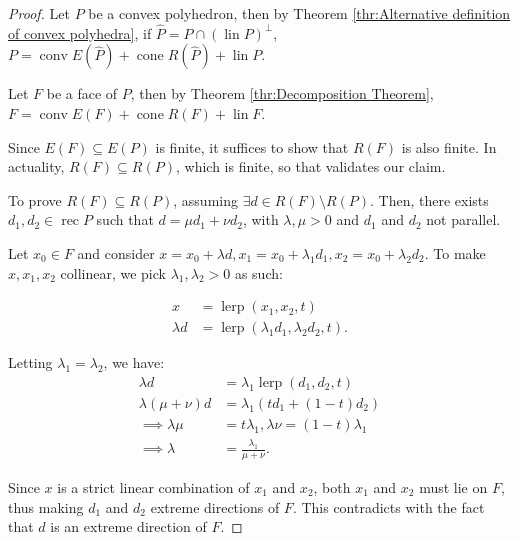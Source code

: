 \begin{proof}
  Let \( P \) be a convex polyhedron, then by Theorem \ref{thr:Alternative
  definition of convex polyhedra}, if \( \hat{P} = P \cap (\operatorname{lin}
  P)^{\perp } \), \( P = \operatorname{conv} E(\hat{P}) + \operatorname{cone}
  R(\hat{P}) + \operatorname{lin} P \).

  Let \( F \) be a face of \( P \), then
  by Theorem \ref{thr:Decomposition Theorem}, \( F =
  \operatorname{conv} E(F) + \operatorname{cone} R(F) + \operatorname{lin} F \).

  Since \( E(F) \subseteq E(P) \) is finite, it suffices to show that \( R(F) \)
  is also finite. In actuality, \( R(F) \subseteq R(P) \), which is finite, so
  that validates our claim.

  To prove \( R(F) \subseteq R(P) \), assuming \( \exists d \in R(F) \setminus
  R(P) \). Then, there exists \( d_{1}, d_{2} \in \operatorname{rec} P \) such
  that \( d = \mu d_{1} + \nu d_{2} \), with \( \lambda, \mu > 0\) and \(
  d_{1} \) and \( d_{2} \) not parallel.

  Let \( x_{0} \in F \) and consider \( x = x_{0} + \lambda d, x_{1} = x_{0} +
  \lambda_{1} d_{1}, x_{2} = x_{0} + \lambda_{2}d_{2} \). To make \( x, x_{1},
  x_{2} \) collinear, we pick \( \lambda_{1}, \lambda_{2} > 0 \) as
  such:

  \begin{align*}
    x &= \operatorname{lerp}(x_{1}, x_{2}, t) \\
    \lambda d &= \operatorname{lerp}(\lambda_{1}d_{1}, \lambda_{2}d_{2}, t)
  .\end{align*}

  Letting \( \lambda_{1} = \lambda_{2} \), we have:
  \begin{align*}
    \lambda d &= \lambda_{1}\operatorname{lerp}(d_{1}, d_{2}, t) \\
              \lambda(\mu + \nu)d &= \lambda_{1} (t d_{1} + (1-t)d_{2}) \\
              \implies \lambda \mu &= t\lambda_{1} , \lambda \nu =
              (1-t)\lambda_{1} \\
              \implies \lambda &= \frac{\lambda_{1}}{\mu + \nu}
  .\end{align*}

  Since \( x \) is a strict linear combination of \( x_{1} \) and \( x_{2}
  \), both \( x_{1} \) and \( x_{2} \) must lie on \( F \), thus making \(
  d_{1} \) and \( d_{2} \) extreme directions of \( F \). This contradicts with
  the fact that \( d \) is an extreme direction of \( F \).
\end{proof}

